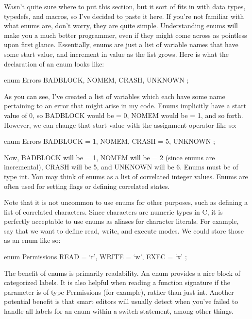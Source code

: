 \documentclass{article}
\begin{document}
Wasn’t quite sure where to put this section, but it sort of fits in with data types, typedefs, and macros, so
I’ve decided to paste it here. If you’re not familiar with what enums are, don’t worry, they are quite simple.
Understanding enums will make you a much better programmer, even if they might come across as pointless upon
first glance. Essentially, enums are just a list of variable names that have some start value, and increment
in value as the list grows. Here is what the declaration of an enum looks like:

\begin{cblk}
enum Errors {
	BADBLOCK,
	NOMEM,
	CRASH,
	UNKNOWN
};
\end{cblk}

As you can see, I’ve created a list of variables which each have some name pertaining to an error that might
arise in my code. Enums implicitly have a start value of 0, so BADBLOCK would be = 0, NOMEM would be = 1, and
so forth. However, we can change that start value with the assignment operator like so:

\begin{cblk}
enum Errors {
	BADBLOCK = 1,
	NOMEM,
	CRASH = 5,
	UNKNOWN
};
\end{cblk}

Now, BADBLOCK will be = 1, NOMEM will be = 2 (since enums are incremental), CRASH will be 5, and UNKNOWN will
be 6. Enums must be of type int. You may think of enums as a list of correlated integer values. Enums are
often used for setting flags or defining correlated states.

Note that it is not uncommon to use enums for other purposes, such as defining a list of correlated
characters. Since characters are numeric types in C, it is perfectly acceptable to use enums as aliases for
character literals. For example, say that we want to define read, write, and execute modes. We could store
those as an enum like so:

\begin{cblk}
enum Permissions {
	READ = ‘r’,
	WRITE = ‘w’,
	EXEC = ‘x’
};
\end{cblk}

The benefit of enums is primarily readability. An enum provides a nice block of categorized labels. It is also
helpful when reading a function signature if the parameter is of type Permissions (for example), rather than
just int. Another potential benefit is that smart editors will usually detect when you’ve failed to handle all
labels for an enum within a switch statement, among other things.
\end{document}
